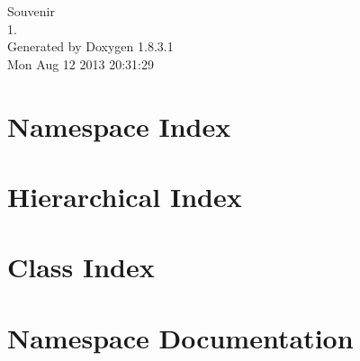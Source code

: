 \documentclass{book}
\begin{document}
\hypersetup{pageanchor=false,citecolor=blue}
\begin{titlepage}
\vspace*{7cm}
\begin{center}
{\Large Souvenir \\[1ex]\large 1. }\\
\vspace*{1cm}
{\large Generated by Doxygen 1.8.3.1}\\
\vspace*{0.5cm}
{\small Mon Aug 12 2013 20:31:29}\\
\end{center}
\end{titlepage}
\clearemptydoublepage
{}
\tableofcontents
\clearemptydoublepage
{}
\hypersetup{pageanchor=true,citecolor=blue}
\chapter{Namespace Index}

\chapter{Hierarchical Index}

\chapter{Class Index}

\chapter{Namespace Documentation}

\end{document}
